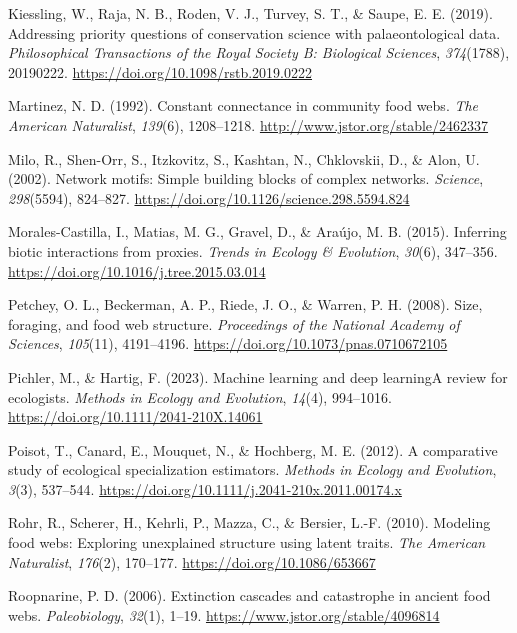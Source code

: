 \documentclass[
]{article}
\newlength{\cslhangindent}
\newenvironment{CSLReferences}[2] %
 {\begin{list}{}{%
  \setlength{\itemindent}{0pt}
  \setlength{\leftmargin}{0pt}
  \setlength{\parsep}{0pt}
  \ifodd #1
   \setlength{\leftmargin}{\cslhangindent}
   \setlength{\itemindent}{-1\cslhangindent}
  \fi
  \setlength{\itemsep}{#2\baselineskip}}}
 {\end{list}}
\begin{document}
\begin{CSLReferences}{1}{0}
Kiessling, W., Raja, N. B., Roden, V. J., Turvey, S. T., \& Saupe, E. E.
(2019). Addressing priority questions of conservation science with
palaeontological data. \emph{Philosophical Transactions of the Royal
Society B: Biological Sciences}, \emph{374}(1788), 20190222.
\url{https://doi.org/10.1098/rstb.2019.0222}

Martinez, N. D. (1992). Constant connectance in community food webs.
\emph{The American Naturalist}, \emph{139}(6), 1208--1218.
\url{http://www.jstor.org/stable/2462337}

Milo, R., Shen-Orr, S., Itzkovitz, S., Kashtan, N., Chklovskii, D., \&
Alon, U. (2002). Network motifs: Simple building blocks of complex
networks. \emph{Science}, \emph{298}(5594), 824--827.
\url{https://doi.org/10.1126/science.298.5594.824}

Morales-Castilla, I., Matias, M. G., Gravel, D., \& Araújo, M. B.
(2015). Inferring biotic interactions from proxies. \emph{Trends in
Ecology \& Evolution}, \emph{30}(6), 347--356.
\url{https://doi.org/10.1016/j.tree.2015.03.014}

Petchey, O. L., Beckerman, A. P., Riede, J. O., \& Warren, P. H. (2008).
Size, foraging, and food web structure. \emph{Proceedings of the
National Academy of Sciences}, \emph{105}(11), 4191--4196.
\url{https://doi.org/10.1073/pnas.0710672105}

Pichler, M., \& Hartig, F. (2023). Machine learning and deep
learning{\textemdash}A review for ecologists. \emph{Methods in Ecology
and Evolution}, \emph{14}(4), 994--1016.
\url{https://doi.org/10.1111/2041-210X.14061}

Poisot, T., Canard, E., Mouquet, N., \& Hochberg, M. E. (2012). A
comparative study of ecological specialization estimators. \emph{Methods
in Ecology and Evolution}, \emph{3}(3), 537--544.
\url{https://doi.org/10.1111/j.2041-210x.2011.00174.x}

Rohr, R., Scherer, H., Kehrli, P., Mazza, C., \& Bersier, L.-F. (2010).
Modeling food webs: Exploring unexplained structure using latent traits.
\emph{The American Naturalist}, \emph{176}(2), 170--177.
\url{https://doi.org/10.1086/653667}

Roopnarine, P. D. (2006). Extinction cascades and catastrophe in ancient
food webs. \emph{Paleobiology}, \emph{32}(1), 1--19.
\url{https://www.jstor.org/stable/4096814}


\end{CSLReferences}
\end{document}
